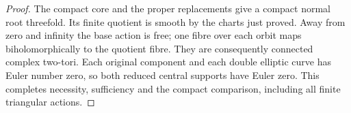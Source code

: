 \begin{proof}
The compact core and the
proper replacements give
a compact normal root
threefold. Its finite
quotient is smooth by the
charts just proved. Away
from zero and infinity
the base action is free;
one fibre over each orbit
maps biholomorphically to
the quotient fibre. They
are consequently connected
complex two-tori. Each
original component and
each double elliptic curve
has Euler number zero,
so both reduced central
supports have Euler zero.
This completes necessity,
sufficiency and the compact
comparison, including all
finite triangular actions.
\end{proof}
